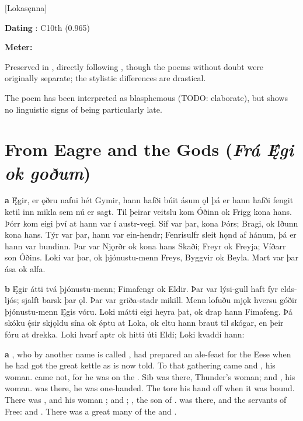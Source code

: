 [Lokasęnna]

\begin{flushright}%
\textbf{Dating} \parencite{Sapp2022}: C10th (0.965)

\textbf{Meter:} \Ljodahattr%
\end{flushright}

Preserved in \Regius, directly following \Hymiskvida, though the poems without doubt were originally separate; the stylistic differences are drastical.

The poem has been interpreted as blasphemous (TODO: elaborate), but shows no linguistic signs of being particularly late.

\sectionline

\section{From Eagre and the Gods (\emph{Frá Ę́gi ok goðum})}

\bpg\bpa \textbf{a} Ę́gir, er ǫðru nafni hét Gymir, hann hafði búit ásum ǫl þá er hann hafði fengit ketil inn mikla sem nú er sagt. Til þeirar veitslu kom Óðinn ok Frigg kona hans. Þórr kom eigi því at hann var í austr-vegi. Sif var þar, kona Þórs; Bragi, ok Iðunn kona hans. Týr var þar, hann var ein-hendr; Fenrisulfr sleit hǫnd af hánum, þá er hann var bundinn. Þar var Njǫrðr ok kona hans Skaði; Freyr ok Freyja; Víðarr son Óðins. Loki var þar, ok þjónustu-menn Freys, Byggvir ok Beyla. Mart var þar ása ok alfa.

\textbf{b} Ę́gir átti tvá þjónustu-menn; Fimafengr ok Eldir. Þar var lýsi-gull haft fyr elds-ljós; sjalft barsk þar ǫl. Þar var griða-stadr mikill. Menn lofuðu mjǫk hversu góðir þjónustu-menn Ę́gis vóru. Loki mátti eigi heyra þat, ok drap hann Fimafeng. Þá skóku ę́sir skjǫldu sína ok ǿptu at Loka, ok eltu hann braut til skógar, en þeir fóru at drekka. Loki hvarf aptr ok hitti úti Eldi; Loki kvaddi hann:\epa

\bpb \textbf{a} , who by another name is called , had prepared an ale-feast for the Eese when he had got the great kettle as is now told. To that gathering came  and , his woman.  came not, for he was on the . Sib was there, Thunder’s woman;  and , his woman.  was there, he was one-handed. The  tore his hand off when it was bound. There was , and his woman ;  and ; , the son of .  was there, and the servants of Free:  and . There was a great many of the  and .


